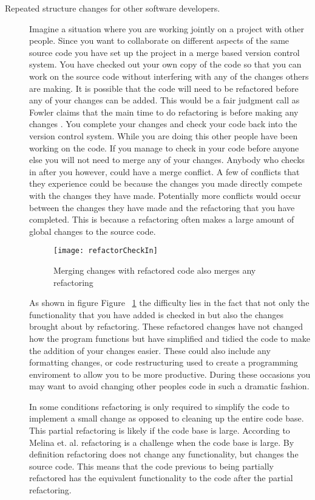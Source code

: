 \begin{description}
\item [Repeated structure changes for other software developers.]
Imagine a situation where you are working jointly on a project with other people. Since you want to collaborate on different aspects of the same source code you have set up the project in a merge based version control system.  You have checked out your own copy of the code so that you can work on the source code without interfering with any of the changes others are making. It is possible that the code will need to be refactored before any of your changes can be added.  This would be a fair judgment call as Fowler claims that the main time to do refactoring is before making any changes \cite{Fowler1999}. You complete your changes and check your code back into the version control system.  While you are doing this other people have been working on the code.  If you manage to check in your code before anyone else you will not need to merge any of your changes.  Anybody who checks in after you however, could have a merge conflict.  A few of conflicts that they experience could be because the changes you made directly compete with the changes they have made. Potentially more conflicts would occur between the changes they have made and the refactoring that you have completed. This is because a refactoring often makes a large amount of global changes to the source code. 

\begin{figure}[!T]
\begin{center}
\texttt{[image: refactorCheckIn]}
\end{center}
\caption{Merging changes with refactored code also merges any refactoring}
\label{fig:motMerge}
\end{figure}

As shown in figure Figure ~\ref{fig:motMerge} the difficulty lies in the fact that not only the functionality that you have added is checked in but also the changes brought about by refactoring.  These refactored changes have not changed how the program functions but have simplified and tidied the code to make the addition of your changes easier. These could also include any formatting changes, or code restructuring used to create a programming enviroment to allow you to be more productive.  During these occasions you may want to avoid changing other peoples code in such a dramatic fashion.

In some conditions refactoring is only required to simplify the code to implement a small change as opposed to cleaning up the entire code base.  This partial refactoring is likely if the code base is large. According to Melina et. al. \cite{Milea2014} refactoring is a challenge when the code base is large. By definition refactoring does not change any functionality, but changes the source code. This means that the code previous to being partially refactored has the equivalent functionality to the code after the partial refactoring.


\end{description}

